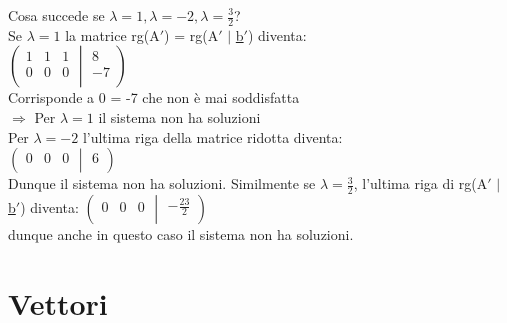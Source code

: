 \textsf{\small Cosa succede se $\lambda = 1, \lambda = -2, \lambda = \frac{3}{2}$?}\\
\enlargethispage{90pt}
\textsf{\small Se $\lambda = 1$ la matrice rg(A$'$) = rg(A$'$ $\mid$ \underline{b$'$}) diventa:}\\

\(
\left(
\begin{matrix}
	1 & 1  &  1\\
	0 &  0  & 0 \\
	 &    & 
\end{matrix}
\middle\vert
\begin{matrix}
	8 \\ -7 \\ 
\end{matrix}
\right)
\)\\
\textsf{\small Corrisponde a 0 = -7 che non è mai soddisfatta} \\
\textsf{\small $\Rightarrow$ Per $\lambda = 1$ il sistema non ha soluzioni} \\
\newpage
\textsf{\small Per $\lambda = -2$ l'ultima riga della matrice ridotta diventa:} \\
\(
\left(
\begin{matrix}
	0 & 0  &  0\\
\end{matrix}
\middle\vert
\begin{matrix}
	6 \\
\end{matrix}
\right)
\)\\
\textsf{\small Dunque il sistema non ha soluzioni. Similmente se $\lambda = \frac{3}{2}$, l'ultima riga di rg(A$'$ $\mid$ \underline{b$'$}) diventa:}
\(
\left(
\begin{matrix}
	0 & 0  &  0\\
\end{matrix}
\middle\vert
\begin{matrix}
	-\frac{23}{2} \\
\end{matrix}
\right)
\)\\
\textsf{\small dunque anche in questo caso il sistema non ha soluzioni.}


\newpage

\section{Vettori}

